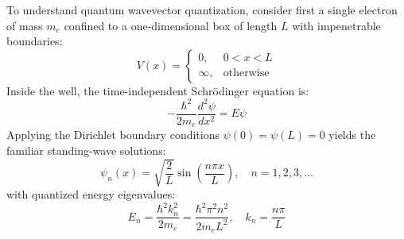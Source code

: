 \documentclass[11pt,a4paper]{article}
\begin{document}
To understand quantum wavevector quantization, consider first a single electron of mass $m_e$ confined to a one-dimensional box of length $L$ with impenetrable boundaries:
\begin{equation}
V(x) = \begin{cases} 0, & 0 < x < L \\ \infty, & \text{otherwise} \end{cases}
\end{equation}
Inside the well, the time-independent Schrödinger equation is:
\begin{equation}
-\frac{\hbar^2}{2m_e}\frac{d^2\psi}{dx^2} = E\psi
\label{eq:schrodinger_1d}
\end{equation}
Applying the Dirichlet boundary conditions $\psi(0) = \psi(L) = 0$ yields the familiar standing-wave solutions:
\begin{equation}
\psi_n(x) = \sqrt{\frac{2}{L}}\sin\left(\frac{n\pi x}{L}\right), \quad n = 1, 2, 3, \dots
\end{equation}
with quantized energy eigenvalues:
\begin{equation}
E_n = \frac{\hbar^2 k_n^2}{2m_e} = \frac{\hbar^2 \pi^2 n^2}{2m_e L^2}, \quad k_n = \frac{n\pi}{L}
\label{eq:1d_energy_levels}
\end{equation}
\end{document}
